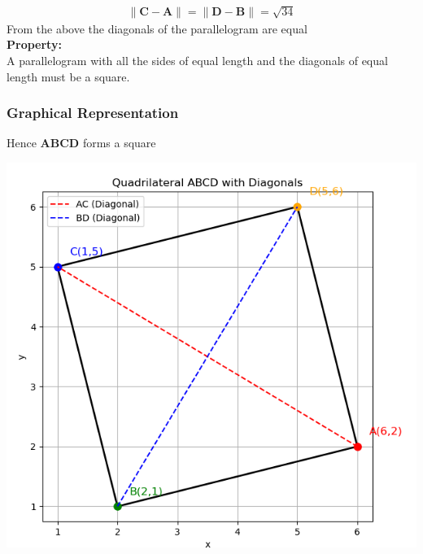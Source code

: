 \documentclass{beamer}
\theoremstyle{remark}
\let\vec\mathbf
\numberwithin{equation}{section}
\begin{document}
        \begin{align}
            \|\vec{C-A}\|=\|\vec{D-B}\|=\sqrt{34} 
        \end{align}
        From the above the diagonals of the parallelogram are equal\\
        \textbf{Property:}\\
        A parallelogram with all the sides of equal length and the diagonals of equal length must be a square.\\
           \begin{frame}
		   \frametitle{Graphical Representation}
		   Hence \textbf{ABCD} forms a square
		   \begin{center}
               \includegraphics[width=0.7\linewidth]{figs/fig1.png}
		 \end{center}
           \end{frame}
\end{document}
